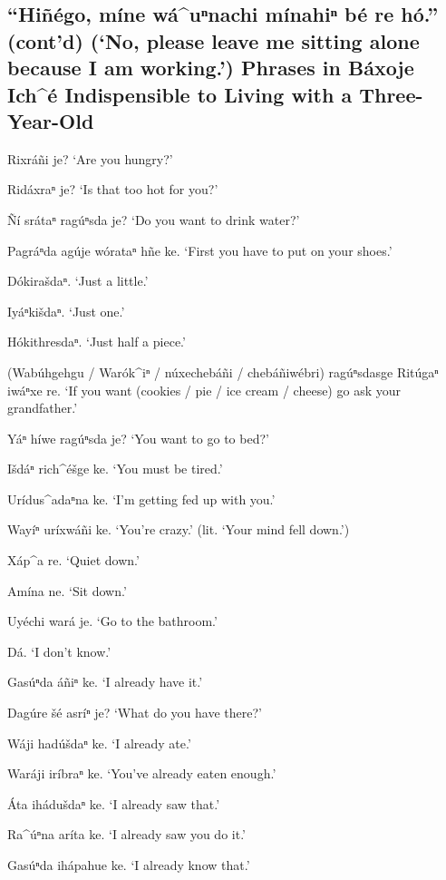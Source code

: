 \documentclass[output=paper]{LSP/langsci}
\begin{document}
\subsection*{``Hiñégo, míne wá\^{ }uⁿnachi mínahiⁿ bé re hó.'' (cont'd)\newline
(`No, please leave me sitting alone because I am working.')\newline
Phrases in Báxoje Ich\^{ }é Indispensible to Living with a Three-Year-Old}
\begin{list}{}{} \itemsep1pt \parskip0pt 

\item{Rixráñi je? `Are you hungry?'}
\item{Ridáxraⁿ je? `Is that too hot for you?'}
\item{\~Ní srátaⁿ ragúⁿsda je? `Do you want to drink water?'}
\item{Pagráⁿda agúje wórataⁿ hñe ke. `First you have to put on your shoes.'}
\item{Dókirašdaⁿ.	`Just a little.'}
\item{}
\item{Iyáⁿkišdaⁿ. `Just one.'}
\item{Hókithre{s}daⁿ. `Just half a piece.'}
\item{(Wabúhgehgu / Warók\^{ }iⁿ / núxechebáñi / chebáñiwébri) ragúⁿsdasge Ritúgaⁿ iwáⁿxe re. `If you want (cookies / pie / ice cream / cheese) go ask your grandfather.'}
\item{Yáⁿ híwe ragúⁿsda je? `You want to go to bed?'}
\item{Išdáⁿ rich\^{ }éšge ke. `You must be tired.'}
\item{}
\item{Urídus\^{ }adaⁿna ke. `I'm getting fed up with you.'}
\item{Wayíⁿ uríxwáñi ke. `You're crazy.' (lit. `Your mind fell down.')}
\item{Xáp\^{ }a re. `Quiet down.'}
\item{Amína ne. `Sit down.'	}
\item{Uyéchi wará je. `Go to the bathroom.'}
\item{}
\item{Dá.	`I don't know.'}
\item{Gasúⁿda áñiⁿ ke.	`I already have it.'}
\item{Dagúre šé asríⁿ je?	 `What do you have there?'}
\item{Wáji hadúšdaⁿ ke. `I already ate.'}
\item{Waráji iríbraⁿ ke. `You've already eaten enough.'}
\item{}
\item{\'Ata ihádušdaⁿ ke.	`I already saw that.'}
\item{Ra\^{ }úⁿna aríta ke.	`I already saw you do it.'}
\item{Gasúⁿda ihápahue ke.	 `I already know that.'}
\item{}
\end{list} 
\end{document}
